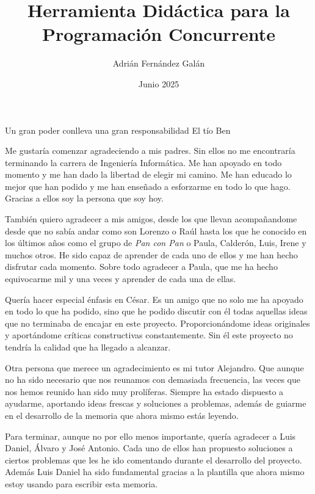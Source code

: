 \documentclass[es]{uc3mthesisIEEE}
\title{Herramienta Didáctica para la Programación Concurrente}
\author{Adrián Fernández Galán}
\date{Junio 2025}
\begin{document}
  \makecover


  \makeepigraph
    {Un gran poder conlleva una gran responsabilidad}  %
    {El tío Ben}  %
    {}  %


  \begin{acknowledgements}
    Me gustaría comenzar agradeciendo a mis padres. Sin ellos no me encontraría terminando la carrera de Ingeniería Informática. Me han apoyado en todo momento y me han dado la libertad de elegir mi camino. Me han educado lo mejor que han podido y me han enseñado a esforzarme en todo lo que hago. Gracias a ellos soy la persona que soy hoy. 

    También quiero agradecer a mis amigos, desde los que llevan acompañandome desde que no sabía andar como son Lorenzo o Raúl hasta los que he conocido en los últimos años como el grupo de \textit{Pan con Pan} o Paula, Calderón, Luis, Irene y muchos otros. He sido capaz de aprender de cada uno de ellos y me han hecho disfrutar cada momento. Sobre todo agradecer a Paula, que me ha hecho equivocarme mil y una veces y aprender de cada una de ellas.   
    
    Quería hacer especial énfasis en César. Es un amigo que no solo me ha apoyado en todo lo que ha podido, sino que he podido discutir con él todas aquellas ideas que no terminaba de encajar en este proyecto. Proporcionándome ideas originales y aportándome críticas constructivas constantemente. Sin él este proyecto no tendría la calidad que ha llegado a alcanzar.
    
    Otra persona que merece un agradecimiento es mi tutor Alejandro. Que aunque no ha sido necesario que nos reunamos con demasiada frecuencia, las veces que nos hemos reunido han sido muy prolíferas. Siempre ha estado dispuesto a ayudarme, aportando ideas frescas y soluciones a problemas, además de guiarme en el desarrollo de la memoria que ahora mismo estás leyendo.

    Para terminar, aunque no por ello menos importante, quería agradecer a Luis Daniel, Álvaro y José Antonio. Cada uno de ellos han propuesto soluciones a ciertos problemas que les he ido comentando durante el desarrollo del proyecto. Además Luis Daniel ha sido fundamental gracias a la plantilla que ahora mismo estoy usando para escribir esta memoria.

  \end{acknowledgements}
\end{document}
